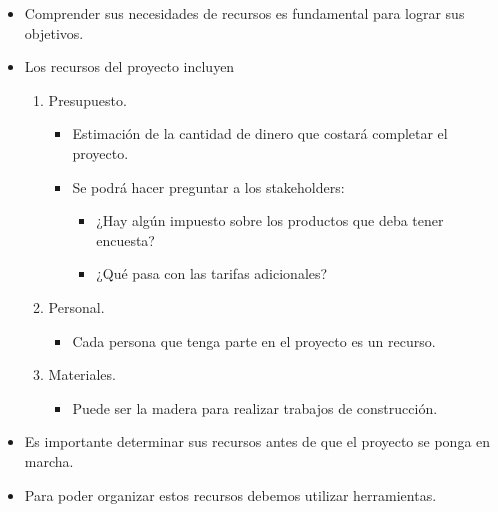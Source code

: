 \documentclass[10pt]{book}
\begin{document}
	    \begin{itemize}
		\item Comprender sus necesidades de recursos es fundamental para lograr sus objetivos.
		\item Los recursos del proyecto incluyen 
		    \begin{enumerate}
			\item Presupuesto.
			    \begin{itemize}
				\item Estimación de la cantidad de dinero que costará completar el proyecto.
				\item Se podrá hacer preguntar a los stakeholders:
				    \begin{itemize}
					\item ¿Hay algún impuesto sobre los productos que deba tener encuesta?
					\item ¿Qué pasa con las tarifas adicionales?
				    \end{itemize}
			    \end{itemize}
			\item Personal.
			    \begin{itemize}
				\item Cada persona que tenga parte en el proyecto es un recurso.
			    \end{itemize}
			\item Materiales.
			    \begin{itemize}
				\item Puede ser la madera para realizar trabajos de construcción.
			    \end{itemize}
		    \end{enumerate}
		\item Es importante determinar sus recursos antes de que el proyecto se ponga en marcha.
		\item Para poder organizar estos recursos debemos utilizar herramientas.
	    \end{itemize}





    
    
\end{document}
